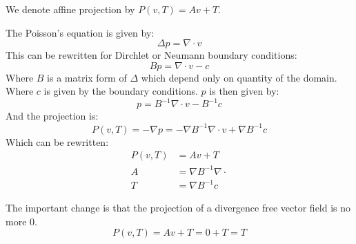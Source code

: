   \begin{definition}
  We denote affine projection by $P(v,T)=Av+T$.
  
  The Poisson's equation is given by:
  \begin{equation}
   \Delta p=\nabla \cdot v
  \end{equation}
This can be rewritten for Dirchlet or Neumann boundary conditions:
\begin{equation}
 B p=\nabla \cdot v-c
\end{equation}
Where $B$ is a matrix form of $\Delta$ which depend only on quantity of the domain.
Where $c$ is given by the boundary conditions.
$p$ is then given by:
\begin{equation}
 p=B^{-1} \nabla \cdot v-B^{-1}c
\end{equation}
And the projection is:
\begin{equation}
 P(v,T)=-\nabla p=-\nabla B^{-1}\nabla \cdot v+\nabla B^{-1}c
\end{equation}
Which can be rewritten:
\begin{align}
P(v,T)&=Av+T\\
A&=\nabla B^{-1}\nabla \cdot\\
T&=\nabla B^{-1}c
\end{align}
  
  \end{definition}
  
  The important change is that the projection of a divergence free vector field is no more 0.
  \begin{equation}
  P(v,T)=Av+T=0+T=T
  \end{equation}



